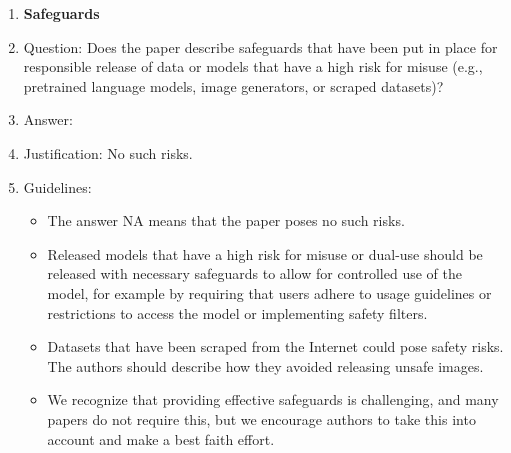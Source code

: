 \documentclass{article}
\begin{document}
\begin{enumerate}
\item {\bf Safeguards}
    \item[] Question: Does the paper describe safeguards that have been put in place for responsible release of data or models that have a high risk for misuse (e.g., pretrained language models, image generators, or scraped datasets)?
    \item[] Answer: \answerNo{} %
    \item[] Justification: No such risks.
    \item[] Guidelines:
    \begin{itemize}
        \item The answer NA means that the paper poses no such risks.
        \item Released models that have a high risk for misuse or dual-use should be released with necessary safeguards to allow for controlled use of the model, for example by requiring that users adhere to usage guidelines or restrictions to access the model or implementing safety filters. 
        \item Datasets that have been scraped from the Internet could pose safety risks. The authors should describe how they avoided releasing unsafe images.
        \item We recognize that providing effective safeguards is challenging, and many papers do not require this, but we encourage authors to take this into account and make a best faith effort.
    \end{itemize}


\end{enumerate}
\end{document}
